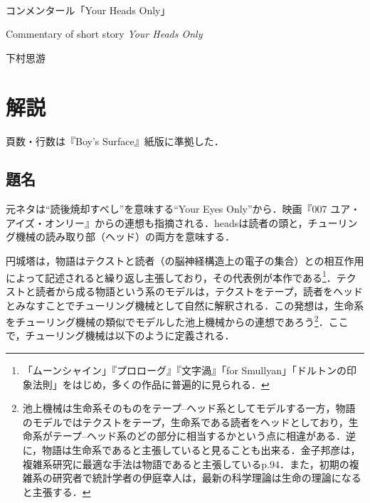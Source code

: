 \documentclass[10pt, a5paper, twoside]{ltjsarticle}
\newcommand{\hyphen}{\insertkanjiskip--\insertkanjiskip}
\begin{document}
	~ %

	\begin{center}

		\Large{コンメンタール「Your Heads Only」}

		\vspace{3mm}

		\large{Commentary of short story \textit{Your Heads Only}}

		\vspace{3mm}

		\large{下村思游}

	\end{center}

	\vspace{3mm}

	\section{解説}

        頁数・行数は『Boy's Surface』紙版\cite{boys}に準拠した．

        \subsection{題名}

        元ネタは“読後焼却すべし”を意味する``Your Eyes Only''から．映画『007 ユア・アイズ・オンリー』からの連想も指摘される．headsは読者の頭と，チューリング機械の読み取り部（ヘッド）の両方を意味する．

        円城塔は，物語はテクストと読者（の脳神経構造上の電子の集合）との相互作用によって記述されると繰り返し主張しており，その代表例が本作である\footnote{「ムーンシャイン」『プロローグ』『文字渦』「for Smullyan」「ドルトンの印象法則」をはじめ，多くの作品に普遍的に見られる．}．テクストと読者から成る物語という系のモデルは，テクストをテープ，読者をヘッドとみなすことでチューリング機械として自然に解釈される．この発想は，生命系をチューリング機械の類似でモデルした池上機械からの連想であろう\footnote{池上機械は生命系そのものをテープ\hyphen ヘッド系としてモデルする一方，物語のモデルではテクストをテープ，生命系である読者をヘッドとしており，生命系がテープ\hyphen ヘッド系のどの部分に相当するかという点に相違がある．逆に，物語は生命系であると主張していると見ることも出来る．金子邦彦は，複雑系研究に最適な手法は物語であると主張している\cite{chaos}p.94．また，初期の複雑系の研究者で統計学者の伊庭幸人は，最新の科学理論は生命の理論になると主張する．}．ここで，チューリング機械は以下のように定義される\cite{sipser2}．
\end{document}
